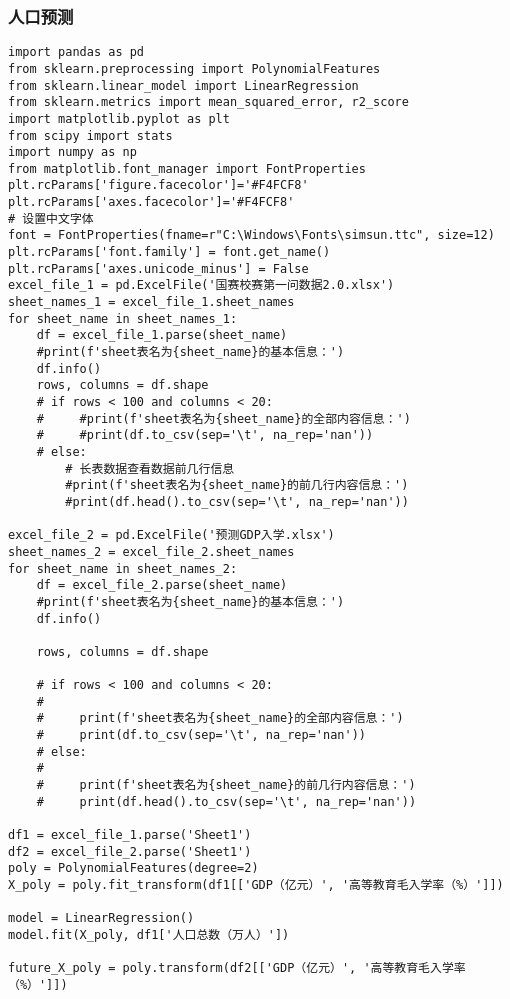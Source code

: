 \documentclass[withoutpreface,bwprint]{cumcmthesis} %
\begin{document}
\subsubsection{人口预测}

\begin{verbatim}
import pandas as pd
from sklearn.preprocessing import PolynomialFeatures
from sklearn.linear_model import LinearRegression
from sklearn.metrics import mean_squared_error, r2_score
import matplotlib.pyplot as plt
from scipy import stats
import numpy as np
from matplotlib.font_manager import FontProperties
plt.rcParams['figure.facecolor']='#F4FCF8'
plt.rcParams['axes.facecolor']='#F4FCF8'
# 设置中文字体
font = FontProperties(fname=r"C:\Windows\Fonts\simsun.ttc", size=12)
plt.rcParams['font.family'] = font.get_name()
plt.rcParams['axes.unicode_minus'] = False
excel_file_1 = pd.ExcelFile('国赛校赛第一问数据2.0.xlsx')
sheet_names_1 = excel_file_1.sheet_names
for sheet_name in sheet_names_1:
    df = excel_file_1.parse(sheet_name)
    #print(f'sheet表名为{sheet_name}的基本信息：')
    df.info()
    rows, columns = df.shape
    # if rows < 100 and columns < 20:
    #     #print(f'sheet表名为{sheet_name}的全部内容信息：')
    #     #print(df.to_csv(sep='\t', na_rep='nan'))
    # else:
        # 长表数据查看数据前几行信息
        #print(f'sheet表名为{sheet_name}的前几行内容信息：')
        #print(df.head().to_csv(sep='\t', na_rep='nan'))

excel_file_2 = pd.ExcelFile('预测GDP入学.xlsx')
sheet_names_2 = excel_file_2.sheet_names
for sheet_name in sheet_names_2:
    df = excel_file_2.parse(sheet_name)
    #print(f'sheet表名为{sheet_name}的基本信息：')
    df.info()

    rows, columns = df.shape

    # if rows < 100 and columns < 20:
    #
    #     print(f'sheet表名为{sheet_name}的全部内容信息：')
    #     print(df.to_csv(sep='\t', na_rep='nan'))
    # else:
    #
    #     print(f'sheet表名为{sheet_name}的前几行内容信息：')
    #     print(df.head().to_csv(sep='\t', na_rep='nan'))

df1 = excel_file_1.parse('Sheet1')
df2 = excel_file_2.parse('Sheet1')
poly = PolynomialFeatures(degree=2)
X_poly = poly.fit_transform(df1[['GDP（亿元）', '高等教育毛入学率（%）']])

model = LinearRegression()
model.fit(X_poly, df1['人口总数（万人）'])

future_X_poly = poly.transform(df2[['GDP（亿元）', '高等教育毛入学率（%）']])


\end{verbatim}
\end{document}
